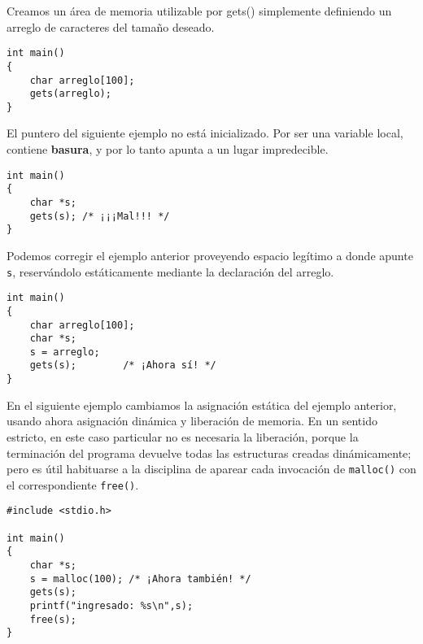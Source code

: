 \begin{ejemplo}
Creamos un área de memoria utilizable por gets() simplemente definiendo un arreglo de caracteres del tamaño deseado. 
\begin{lstlisting}
int main()
{
    char arreglo[100];
    gets(arreglo);
}
\end{lstlisting}

El puntero del siguiente ejemplo no está inicializado. Por ser una variable local,
contiene \textbf{basura}, y por lo tanto apunta a un lugar impredecible.
\begin{lstlisting}
int main()
{
    char *s;
    gets(s); /* ¡¡¡Mal!!! */
}
\end{lstlisting}

Podemos corregir el ejemplo anterior proveyendo espacio legítimo a donde apunte \lstinline{s}, reservándolo
estáticamente mediante la declaración del arreglo.

\begin{lstlisting}
int main()
{
    char arreglo[100];
    char *s;
    s = arreglo;
    gets(s); 		/* ¡Ahora sí! */
}
\end{lstlisting}

En el siguiente ejemplo cambiamos la asignación estática del ejemplo anterior, usando ahora asignación dinámica y liberación de memoria. En un
sentido estricto, en este caso particular no es necesaria la liberación, porque
la terminación del programa devuelve todas las estructuras creadas
dinámicamente; pero es útil habituarse a la disciplina de aparear cada
invocación de \lstinline{malloc()} con el correspondiente \lstinline{free()}.

\begin{lstlisting}
#include <stdio.h>

int main()
{
    char *s;
    s = malloc(100); /* ¡Ahora también! */
    gets(s);
    printf("ingresado: %s\n",s);
    free(s);
}
\end{lstlisting}
\end{ejemplo}



